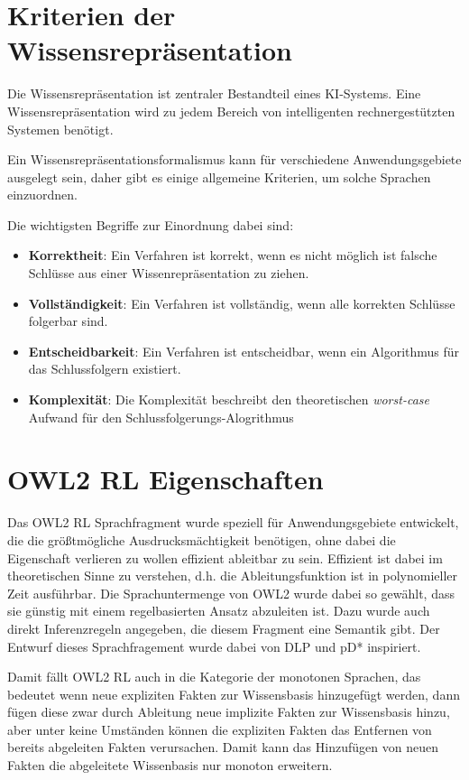 \section{Kriterien der Wissensrepräsentation}

Die Wissensrepräsentation ist zentraler Bestandteil eines KI-Systems. Eine Wissensrepräsentation wird zu jedem Bereich von intelligenten rechnergestützten Systemen benötigt.

Ein Wissensrepräsentationsformalismus kann für verschiedene Anwendungsgebiete ausgelegt sein, daher gibt es einige allgemeine Kriterien, um solche Sprachen einzuordnen.

Die wichtigsten Begriffe zur Einordnung dabei sind:
\begin{itemize}
	\item \textbf{Korrektheit}:
Ein Verfahren ist korrekt, wenn es nicht möglich ist falsche Schlüsse aus einer Wissenrepräsentation zu ziehen.
	\item \textbf{Vollständigkeit}:
Ein Verfahren ist vollständig, wenn alle korrekten Schlüsse folgerbar sind.
	\item \textbf{Entscheidbarkeit}:
Ein Verfahren ist entscheidbar, wenn ein Algorithmus für das Schlussfolgern existiert.
	\item \textbf{Komplexität}:
Die Komplexität beschreibt den theoretischen \emph{worst-case} Aufwand für den Schlussfolgerungs-Alogrithmus
\end{itemize}

\section{OWL2 RL Eigenschaften}
Das OWL2 RL Sprachfragment wurde speziell für Anwendungsgebiete entwickelt, die die größtmögliche Ausdrucksmächtigkeit benötigen, ohne dabei die Eigenschaft verlieren zu wollen effizient ableitbar zu sein. Effizient ist dabei im theoretischen Sinne zu verstehen, d.h. die Ableitungsfunktion ist in polynomieller Zeit ausführbar. Die Sprachuntermenge von OWL2 wurde dabei so gewählt, dass sie günstig mit einem regelbasierten Ansatz abzuleiten ist. Dazu wurde auch direkt Inferenzregeln angegeben, die diesem Fragment eine Semantik gibt. Der Entwurf dieses Sprachfragement wurde dabei von DLP \cite{Grosof2003} und pD* \cite{Li2006} inspiriert.

Damit fällt OWL2 RL auch in die Kategorie der monotonen Sprachen, das bedeutet wenn neue expliziten Fakten zur Wissensbasis hinzugefügt werden, dann fügen diese zwar durch Ableitung neue implizite Fakten zur Wissensbasis hinzu, aber unter keine Umständen können die expliziten Fakten das Entfernen von bereits abgeleiten Fakten verursachen. Damit kann das Hinzufügen von neuen Fakten die abgeleitete Wissenbasis nur monoton erweitern.

